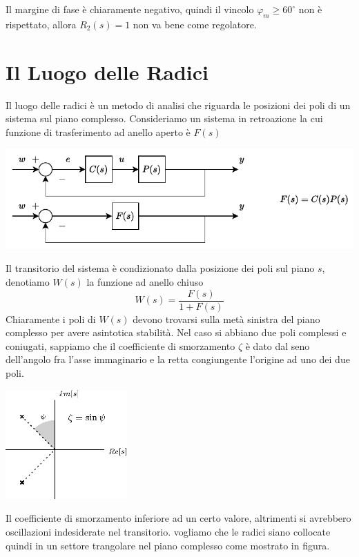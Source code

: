 \documentclass[10pt, letterpaper]{report}
\begin{document}
Il margine di fase è chiaramente negativo, quindi il vincolo $\varphi_m\ge 60^\circ$ non è rispettato, allora $R_2(s)=1$ non va bene come regolatore.\\
\newpage 










\section{Il Luogo delle Radici}
Il luogo delle radici è un metodo di analisi che riguarda le posizioni dei poli di un sistema sul piano complesso. Consideriamo un sistema in retroazione la cui funzione di trasferimento ad anello aperto è $F(s)$
\begin{center}
    \includegraphics[width=1\textwidth ]{images/EsempioProgControllore2.pdf}
\end{center}
Il transitorio del sistema è condizionato dalla posizione dei poli sul piano $s$, denotiamo $W(s)$ la funzione ad anello chiuso $$W(s)=\frac{F(s)}{1+F(s)} $$
Chiaramente i poli di $W(s)$ devono trovarsi sulla metà sinistra del piano complesso per avere asintotica stabilità. Nel caso si abbiano due poli complessi e coniugati, sappiamo che il coefficiente di smorzamento $\zeta$ è dato dal seno dell'angolo fra l'asse immaginario e la retta congiungente l'origine ad uno dei due poli.
\begin{center}
    \includegraphics[width=0.35\textwidth ]{images/coefficienteSmorzamento.eps}
\end{center}
Il coefficiente di smorzamento  inferiore ad un certo valore, altrimenti si avrebbero oscillazioni indesiderate nel transitorio. vogliamo che le radici siano collocate quindi in un settore trangolare nel piano complesso come mostrato in figura.\bigskip 
\end{document}
